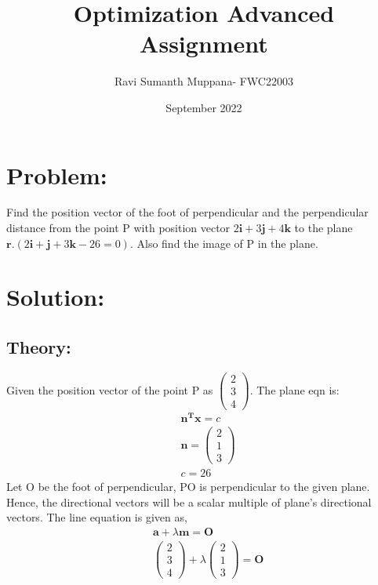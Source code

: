\documentclass[a4paper,12pt,twocolumn]{article}
\title{Optimization Advanced Assignment}
\author{Ravi Sumanth Muppana- FWC22003}
\date{September 2022}
\let\vec\mathbf
\newcommand{\myvec}[1]{\ensuremath{\begin{pmatrix}#1\end{pmatrix}}}
\begin{document}
\maketitle
\section{Problem:}
Find the position vector of the foot of perpendicular and the perpendicular distance from the point P with position vector $2\vec{i}+3\vec{j}+4\vec{k}$ to the plane $\vec{r}.(2\vec{i}+\vec{j}+3\vec{k}-26=0)$. Also find the image of P in the plane.
\maketitle
\section{Solution:}
\subsection{Theory:}
Given the position vector of the point P as $\myvec{2\\3\\4}$. The plane eqn is:
\begin{align}
	&\vec{n^Tx}=c\\
	&\vec{n} = \myvec{2\\1\\3}\\
	&c = 26
\end{align}
Let O be the foot of perpendicular, PO is perpendicular to the given plane. Hence, the directional vectors will be a scalar multiple of plane's directional vectors. The line equation is given as,
\begin{align}
	&\vec{a}+\lambda\vec{m} = \vec{O}\\
	&\myvec{2\\3\\4}+\lambda\myvec{2\\1\\3} = \vec{O}
\end{align}
\end{document}
